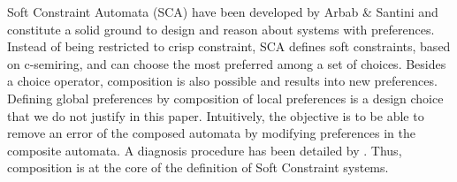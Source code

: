 %
%



Soft Constraint Automata (SCA) have been developed by Arbab \& Santini \cite{Arbab2013} and constitute a solid ground to design and reason about systems with preferences. Instead of being restricted to crisp constraint, SCA defines soft constraints, based on c-semiring, and can choose the most preferred among a set of choices. Besides a choice operator, composition is also possible and results into new preferences. Defining global preferences by composition of local preferences is a design choice that we do not justify in this paper. Intuitively, the objective is to be able to remove an error of the composed automata by modifying preferences in the composite automata. A diagnosis procedure has been detailed by \cite{KAT17} . Thus, composition is at the core of the definition of Soft Constraint systems. 

